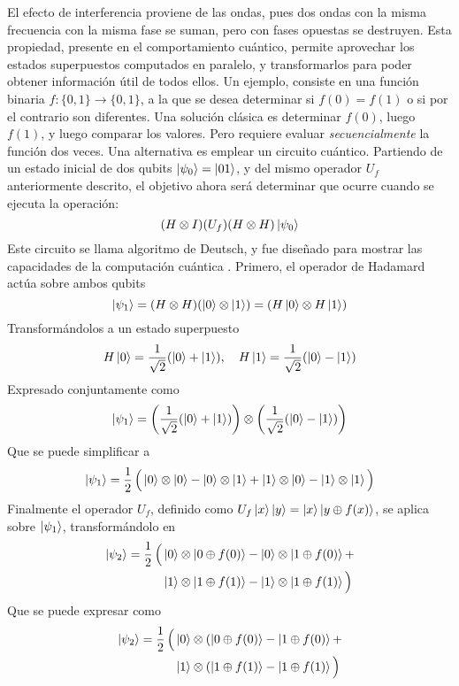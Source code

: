 El efecto de interferencia proviene de las ondas, pues dos ondas con la misma 
frecuencia con la misma fase se suman, pero con fases opuestas se destruyen.  
Esta propiedad, presente en el comportamiento cuántico, permite aprovechar los 
estados superpuestos computados en paralelo, y transformarlos para poder obtener 
información útil de todos ellos.
Un ejemplo, consiste en una función binaria $f:\{0,1\} \rightarrow \{0,1\}$, a 
la que se desea determinar si $f(0) = f(1)$ o si por el contrario son 
diferentes. Una solución clásica es determinar $f(0)$, luego $f(1)$, y luego 
comparar los valores. Pero requiere evaluar \textit{secuencialmente} la función 
dos veces. Una alternativa es emplear un circuito cuántico.
Partiendo de un estado inicial de dos qubits $\ket{\psi_{0}} = \ket{01}$, y del mismo 
operador $U_f$ anteriormente descrito, el objetivo ahora será determinar que 
ocurre cuando se ejecuta la operación:
$$ (H \otimes I)(U_f)(H \otimes H)\ket{\psi_{0}} $$
Este circuito se llama algoritmo de Deutsch, y fue diseñado para mostrar las 
capacidades de la computación cuántica \cite{deutsch85}.
Primero, el operador de Hadamard actúa sobre ambos qubits
$$ \ket{\psi_{1}} = (H \otimes H)(\ket{0} \otimes \ket{1}) =
(H \ket{0} \otimes H \ket{1})$$
Transformándolos a un estado superpuesto
$$H \ket 0 = \frac{1}{\sqrt 2}(\ket 0 + \ket 1), \quad
H \ket 1 = \frac{1}{\sqrt 2}(\ket 0 - \ket 1)$$
Expresado conjuntamente como
$$ \ket{\psi_{1}} = \left( \frac{1}{\sqrt 2}(\ket 0 + \ket 1) \right)
\otimes \left( \frac{1}{\sqrt 2}(\ket 0 - \ket 1) \right) $$
Que se puede simplificar a
$$ \ket{\psi_{1}} = \frac{1}{2} \, \Big( \ket{0} \otimes \ket{0} - \ket{0} \otimes \ket{1} + \ket{1} \otimes \ket{0} - \ket{1} \otimes \ket{1} \Big) $$
Finalmente el operador $U_f$, definido como $ U_f \ket{x}\ket{y} = \ket{x}\ket{y 
\oplus f(x)}$, se aplica sobre $\ket{\psi_{1}}$, transformándolo en
\begin{equation*}
\begin{split}
\ket{\psi_{2}} = \frac{1}{2} \, \Big(
&\ket{0} \otimes \ket{0 \oplus f(0)} - \ket{0} \otimes \ket{1 \oplus f(0)} + \\
&\ket{1} \otimes \ket{1 \oplus f(1)} - \ket{1} \otimes \ket{1 \oplus f(1)} \Big)
\end{split}
\end{equation*}
Que se puede expresar como
\begin{equation*}
\begin{split}
\ket{\psi_{2}} = \frac{1}{2} \, \Big(
& \ket{0} \otimes ( \ket{0 \oplus f(0)} - \ket{1 \oplus f(0)} + \\
& \ket{1} \otimes ( \ket{1 \oplus f(1)} - \ket{1 \oplus f(1)} \Big)
\end{split}
\end{equation*}
